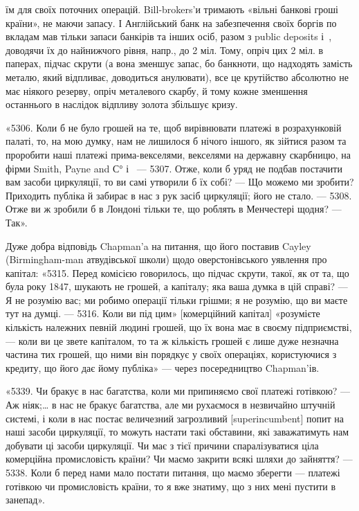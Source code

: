 \parcont{}  %
їм для своїх поточних операцій. Bill-brokers’и тримають «вільні банкові гроші
країни», не маючи запасу. І Англійський банк на забезпечення своїх боргів по
вкладам мав тільки запаси банкірів та інших осіб, разом з public deposits і~,
доводячи їх до найнижчого рівня, напр., до 2 міл. Тому, опріч цих 2 міл. в паперах,
підчас скрути (а вона зменшує запас, бо банкноти, що надходять замість
металю, який відпливає, доводиться анулювати), все це крутійство абсолютно
не має ніякого резерву, опріч металевого скарбу, й тому кожне зменшення останнього
в наслідок відпливу золота збільшує кризу.

«5306. Коли б не було грошей на те, щоб вирівнювати платежі в розрахунковій
палаті, то, на мою думку, нам не лишилося б нічого іншого, як
зійтися разом та проробити наші платежі прима-векселями, векселями на державну
скарбницю, на фірми Smith, Payne and С° і~ — 5307. Отже, коли б
уряд не подбав постачити вам засоби циркуляції, то ви самі утворили б їх
собі? — Що можемо ми зробити? Приходить публіка й забирає в нас з рук
засіб циркуляції; його не стало. — 5308. Отже ви ж зробили б в Лондоні тільки
те, що роблять в Менчестері щодня? — Так».

Дуже добра відповідь Chapman’a на питання, що його поставив Cayley
(Birmingham-man атвудівської школи) щодо оверстонівського уявлення про
капітал: «5315. Перед комісією говорилось, що підчас скрути, такої, як от та,
що була року 1847, шукають не грошей, а капіталу; яка ваша думка в цій
справі? — Я не розумію вас; ми робимо операції тільки грішми; я не розумію,
що ви маєте тут на думці. — 5316. Коли ви під цим» [комерційний капітал]
«розумієте кількість належних певній людині грошей, що їх вона має в
своєму підприємстві, — коли ви це звете капіталом, то та ж кількість грошей є
лише дуже незначна частина тих грошей, що ними він порядкує у своїх операціях,
користуючися з кредиту, що його дає йому публіка» — через посередництво
Chapman’ів.

«5339. Чи бракує в нас багатства, коли ми припиняємо свої платежі готівкою?
— Аж ніяк;\dots{} в нас не бракує багатства, але ми рухаємося в незвичайно
штучній системі, і коли в нас постає величезний загрозливий [superincumbent]
попит на наші засоби циркуляції, то можуть настати такі обставини, які
заважатимуть нам добувати ці засоби циркуляції. Чи має з тієї причини спаралізуватися
ціла комерційна промисловість країни? Чи маємо закрити всякі
шляхи до зайняття? — 5338. Коли б перед нами мало постати питання, що
маємо зберегти — платежі готівкою чи промисловість країни, то я вже знатиму,
що з них мені пустити в занепад».

